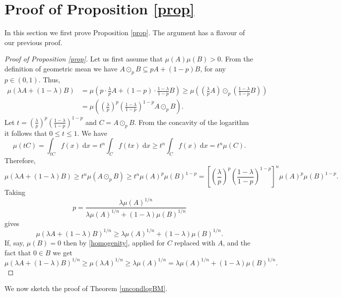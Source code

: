 \documentclass[11pt]{article}
\newcommand{\call}[4]{\int_{#1}^{#2} {#3} \; \textrm{d} {#4}}
\newcommand{\1}{\mathbf{{1}}}
\theoremstyle{definition}
\begin{document}
\section{Proof of Proposition \ref{prop}}  \label{logBM->BM}

In this section we first prove Proposition \ref{prop}. The argument has a flavour of our previous proof.

\begin{proof}[Proof of Proposition \ref{prop}]

Let us first assume that $\mu(A)\mu(B)>0$. From the definition of geometric mean we have $A \odot_p B \subseteq p A + (1-p)B$, for any $p \in (0,1)$. Thus,
\begin{align*}
	\mu(\lambda A+(1-\lambda)B) & = \mu\left( p \cdot   \frac{\lambda}{p} A+(1-p) \cdot \frac{1-\lambda}{1-p} B \right) \geq \mu\left(\left( \frac{\lambda}{p} A \right) \odot_p \left( \frac{1-\lambda}{1-p} B \right) \right) \\
	& = \mu\left(\left( \frac{\lambda}{p}  \right)^p  \left( \frac{1-\lambda}{1-p}  \right)^{1-p}  A \odot_p B \right).
\end{align*}
Let $t =\left( \frac{\lambda}{p}  \right)^p \left( \frac{1-\lambda}{1-p}  \right)^{1-p}$ and $C= A \odot_p B$. From the concavity of the logarithm it follows that $0 \leq t \leq 1$. We have
\begin{equation}\label{homogenity}
	\mu(tC) = \call{tC}{}{f(x)}{x} = t^n \call{C}{}{f(tx)}{x} \geq t^n \call{C}{}{f(x)}{x} = t^n \mu(C).
\end{equation}
Therefore,
\[
	\mu(\lambda A+(1-\lambda)B) \geq  t^n \mu( A \odot_p B) \geq t^n \mu(A)^p \mu(B)^{1-p} = \left[ \left( \frac{\lambda}{p}  \right)^p \left( \frac{1-\lambda}{1-p}  \right)^{1-p} \right]^n \mu(A)^p \mu(B)^{1-p}.
\]
Taking
\begin{equation}\label{optp}
	p = \frac{\lambda \mu(A)^{1/n}}{\lambda \mu(A)^{1/n} + (1-\lambda) \mu(B)^{1/n}}
\end{equation}
gives
\[
	\mu(\lambda A + (1-\lambda)B)^{1/n} \geq \lambda \mu(A)^{1/n} + (1-\lambda)\mu(B)^{1/n}.
\]
If, say, $\mu(B)=0$ then by \eqref{homogenity}, applied for $C$ replaced with $A$, and the fact that $0 \in B$ we get
\[
	\mu(\lambda A+(1-\lambda)B)^{1/n} \geq \mu(\lambda A)^{1/n} \geq \lambda \mu(A)^{1/n} =  \lambda \mu(A)^{1/n} + (1-\lambda)\mu(B)^{1/n}.
\]
\end{proof}

We now sketch the proof of Theorem \ref{uncondlogBM}.
\end{document}
